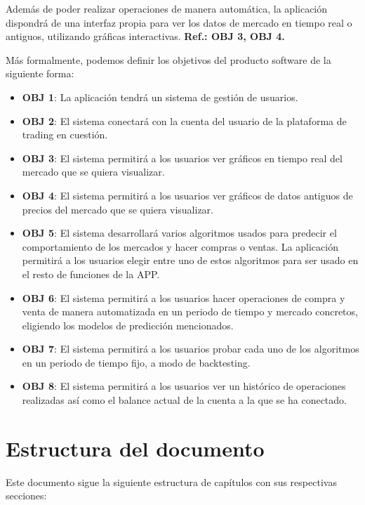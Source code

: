 Además de poder realizar operaciones de manera automática, la aplicación dispondrá de una interfaz propia para ver los datos de mercado en tiempo real o antiguos, utilizando gráficas interactivas. \textbf{Ref.: OBJ 3, OBJ 4.}\newline

Más formalmente, podemos definir los objetivos del producto software de la siguiente forma:


\begin{itemize}
	
	\item \textbf{OBJ 1}: La aplicación tendrá un sistema de gestión de usuarios.	
	\item \textbf{OBJ 2}: El sistema conectará con la cuenta del usuario de la plataforma de trading en cuestión.
	\item \textbf{OBJ 3}: El sistema permitirá a los usuarios ver gráficos en tiempo real del mercado que se quiera visualizar.
	\item \textbf{OBJ 4}: El sistema permitirá a los usuarios ver gráficos de datos antiguos de precios del mercado que se quiera visualizar.
	\item \textbf{OBJ 5}: El sistema desarrollará varios algoritmos usados para predecir el comportamiento de los mercados y hacer compras o ventas. La aplicación permitirá a los usuarios elegir entre uno de estos algoritmos para ser usado en el resto de funciones de la APP.
	\item \textbf{OBJ 6}: El sistema permitirá a los usuarios hacer operaciones de compra y venta de manera automatizada en un periodo de tiempo y mercado concretos, eligiendo los modelos de predicción mencionados.
	\item \textbf{OBJ 7}: El sistema permitirá a los usuarios probar cada uno de los algoritmos en un periodo de tiempo fijo, a modo de backtesting.
	\item \textbf{OBJ 8}: El sistema permitirá a los usuarios ver un histórico de operaciones realizadas así como el balance actual de la cuenta a la que se ha conectado.
	
\end{itemize}


\section{Estructura del documento}

Este documento sigue la siguiente estructura de capítulos con sus respectivas secciones:\newline \\

